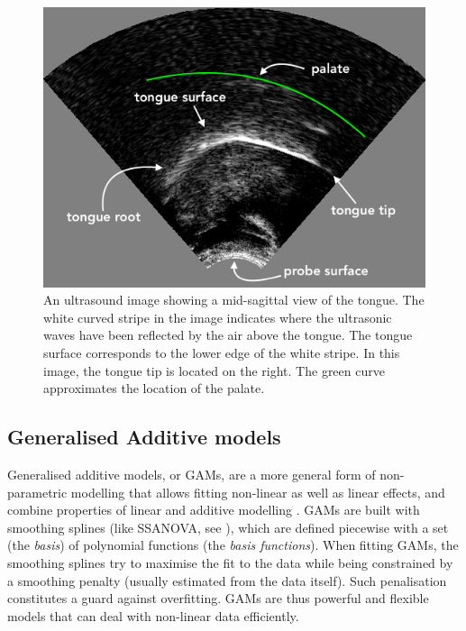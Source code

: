 \documentclass[11pt,]{article}
\begin{document}
\begin{figure}
  \centering
  \includegraphics{./img/Figure01-uti.png}
  \caption{An ultrasound image showing a mid-sagittal view of the tongue. The white curved stripe in the image indicates where the ultrasonic waves have been reflected by the air above the tongue. The tongue surface corresponds to the lower edge of the white stripe. In this image, the tongue tip is located on the right. The green curve approximates the location of the palate.}
  \label{f:uti}
\end{figure}

\hypertarget{generalised-additive-models}{%
\subsection{Generalised Additive
models}\label{generalised-additive-models}}

Generalised additive models, or GAMs, are a more general form of
non-parametric modelling that allows fitting non-linear as well as
linear effects, and combine properties of linear and additive modelling
\citep{hastie1986}. GAMs are built with smoothing splines (like SSANOVA,
see \citealt{helwig2016}), which are defined piecewise with a set (the
\emph{basis}) of polynomial functions (the \emph{basis functions}). When
fitting GAMs, the smoothing splines try to maximise the fit to the data
while being constrained by a smoothing penalty (usually estimated from
the data itself). Such penalisation constitutes a guard against
overfitting. GAMs are thus powerful and flexible models that can deal
with non-linear data efficiently.
\end{document}
